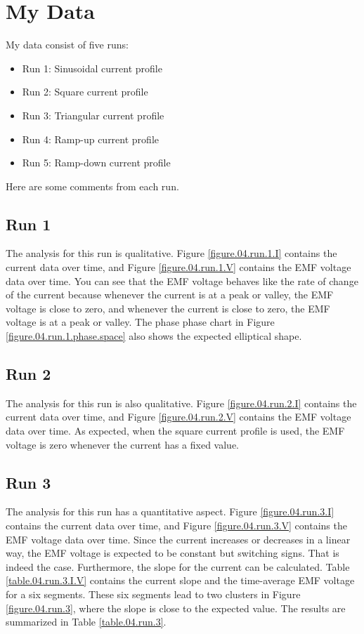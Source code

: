\section{My Data}
%
My data consist of five runs:
\begin{itemize}
	\item Run 1: Sinusoidal current profile
	\item Run 2: Square current profile
	\item Run 3: Triangular current profile
	\item Run 4: Ramp-up current profile
	\item Run 5: Ramp-down current profile
\end{itemize}
Here are some comments from each run.
%
\subsection{Run 1}
%
The analysis for this run is qualitative. Figure \ref{figure.04.run.1.I} contains the current data over time, and Figure \ref{figure.04.run.1.V} contains the EMF voltage data over time. You can see that the EMF voltage behaves like the rate of change of the current because whenever the current is at a peak or valley, the EMF voltage is close to zero, and whenever the current is close to zero, the EMF voltage is at a peak or valley. The phase phase chart in Figure \ref{figure.04.run.1.phase.space} also shows the expected elliptical shape.
%
\subsection{Run 2}
%
The analysis for this run is also qualitative. Figure \ref{figure.04.run.2.I} contains the current data over time, and Figure \ref{figure.04.run.2.V} contains the EMF voltage data over time. As expected, when the square current profile is used, the EMF voltage is zero whenever the current has a fixed value.
%
\subsection{Run 3}
%
The analysis for this run has a quantitative aspect. Figure \ref{figure.04.run.3.I} contains the current data over time, and Figure \ref{figure.04.run.3.V} contains the EMF voltage data over time. Since the current increases or decreases in a linear way, the EMF voltage is expected to be constant but switching signs. That is indeed the case. Furthermore, the slope for the current can be calculated. Table \ref{table.04.run.3.I.V} contains the current slope and the time-average EMF voltage for a six segments. These six segments lead to two clusters in Figure \ref{figure.04.run.3}, where the slope is close to the expected value. The results are summarized in Table \ref{table.04.run.3}.
%
